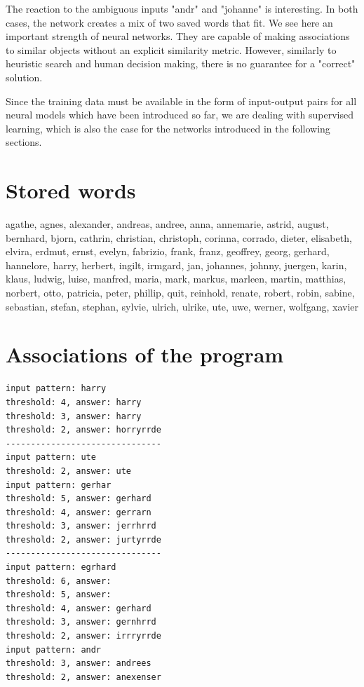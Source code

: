 \documentclass[10pt]{book}
\begin{document}
The reaction to the ambiguous inputs "andr" and "johanne" is interesting. In both cases, the network creates a mix of two saved words that fit. We see here an important strength of neural networks. They are capable of making associations to similar objects without an explicit similarity metric. However, similarly to heuristic search and human decision making, there is no guarantee for a "correct" solution.

Since the training data must be available in the form of input-output pairs for all neural models which have been introduced so far, we are dealing with supervised learning, which is also the case for the networks introduced in the following sections.

\section{Stored words}
agathe, agnes, alexander, andreas, andree, anna, annemarie, astrid, august, bernhard, bjorn, cathrin, christian, christoph, corinna, corrado, dieter, elisabeth, elvira, erdmut, ernst, evelyn, fabrizio, frank, franz, geoffrey, georg, gerhard, hannelore, harry, herbert, ingilt, irmgard, jan, johannes, johnny, juergen, karin, klaus, ludwig, luise, manfred, maria, mark, markus, marleen, martin, matthias, norbert, otto, patricia, peter, phillip, quit, reinhold, renate, robert, robin, sabine, sebastian, stefan, stephan, sylvie, ulrich, ulrike, ute, uwe, werner, wolfgang, xavier
\section{Associations of the program}

\begin{verbatim}
input pattern: harry
threshold: 4, answer: harry
threshold: 3, answer: harry
threshold: 2, answer: horryrrde
-------------------------------
input pattern: ute
threshold: 2, answer: ute
input pattern: gerhar
threshold: 5, answer: gerhard
threshold: 4, answer: gerrarn
threshold: 3, answer: jerrhrrd
threshold: 2, answer: jurtyrrde
-------------------------------
input pattern: egrhard
threshold: 6, answer:
threshold: 5, answer:
threshold: 4, answer: gerhard
threshold: 3, answer: gernhrrd
threshold: 2, answer: irrryrrde
input pattern: andr
threshold: 3, answer: andrees
threshold: 2, answer: anexenser
\end{verbatim}
\end{document}
